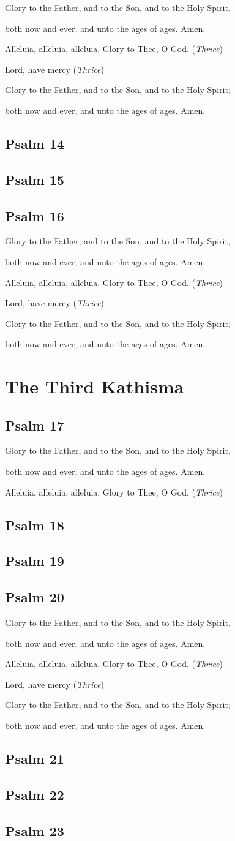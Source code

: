 \documentclass[12pt,openany]{book}
\newcommand{\kathismabreak}{
  \medskip
  \begin{center}
  \begin{footnotesize}
  Glory to the Father, and to the Son, and to the Holy Spirit,
  
  both now and ever, and unto the ages of ages. Amen.

  Alleluia, alleluia, alleluia. Glory to Thee, O God. (\textit{Thrice})

  Lord, have mercy (\textit{Thrice})

  Glory to the Father, and to the Son, and to the Holy Spirit;
  
  both now and ever, and unto the ages of ages. Amen.
  \end{footnotesize}
  \end{center}
  \smallbreak
}
\newcommand{\kathismaend}{
  \medskip
  \begin{center}
  \begin{footnotesize}
  Glory to the Father, and to the Son, and to the Holy Spirit,
  
  both now and ever, and unto the ages of ages. Amen.

  Alleluia, alleluia, alleluia. Glory to Thee, O God. (\textit{Thrice})
  \end{footnotesize}
  \end{center}
  \smallbreak
}
\begin{document}
\kathismabreak
\section{Psalm 14}

\smallskip
\section{Psalm 15}

\smallskip
\section{Psalm 16}


\kathismabreak

\chapter*{The Third Kathisma}
\smallskip
\section{Psalm 17}


\kathismaend
\smallskip
\section{Psalm 18}

\smallskip

\section{Psalm 19}

\smallskip
\section{Psalm 20}


\kathismabreak
\smallskip
\section{Psalm 21}

\smallskip
\section{Psalm 22}

\smallskip
\section{Psalm 23}

\end{document}

